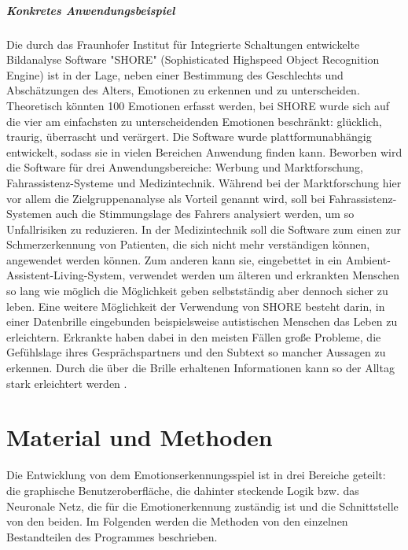\documentclass[12pt,a4paper,headinclude,twoside, plainheadsepline, open=right,numbers=noenddot]{scrreprt}
\begin{document}
\paragraph{Konkretes Anwendungsbeispiel}
Die durch das Fraunhofer Institut für Integrierte Schaltungen entwickelte Bildanalyse Software "{}SHORE"{}  (Sophisticated Highspeed Object Recognition Engine)  ist in der Lage, neben einer Bestimmung des Geschlechts und Abschätzungen des Alters, Emotionen zu erkennen und zu unterscheiden. Theoretisch könnten 100 Emotionen erfasst werden, bei SHORE wurde sich auf die vier am einfachsten zu unterscheidenden Emotionen beschränkt: glücklich, traurig, überrascht und verärgert. Die Software wurde plattformunabhängig entwickelt, sodass sie in vielen Bereichen Anwendung finden kann. Beworben wird die Software für drei Anwendungsbereiche: Werbung und Marktforschung, Fahrassistenz-Systeme und Medizintechnik. Während bei der Marktforschung hier vor allem die Zielgruppenanalyse als Vorteil genannt wird, soll bei Fahrassistenz-Systemen auch die Stimmungslage des Fahrers analysiert werden, um so Unfallrisiken zu reduzieren. In der Medizintechnik soll die Software zum einen zur Schmerzerkennung von Patienten, die sich nicht mehr verständigen können, angewendet werden können. Zum anderen kann sie, eingebettet in ein Ambient-Assistent-Living-System, verwendet werden um älteren und erkrankten Menschen so lang wie möglich die Möglichkeit geben selbstständig aber dennoch sicher zu leben.
Eine weitere Möglichkeit der Verwendung von SHORE besteht darin, in einer Datenbrille eingebunden beispielsweise autistischen Menschen das Leben zu erleichtern. Erkrankte haben dabei in den meisten Fällen große Probleme, die Gefühlslage ihres Gesprächspartners und den Subtext so mancher Aussagen zu erkennen. Durch die über die Brille erhaltenen Informationen kann so der Alltag stark erleichtert werden \cite{SHORE}. 

\chapter{Material und Methoden}
Die Entwicklung von dem Emotionserkennungsspiel ist in drei Bereiche geteilt:
die graphische Benutzeroberfläche, die dahinter steckende Logik bzw. das
Neuronale Netz, die für die Emotionerkennung zuständig ist und die Schnittstelle
von den beiden. Im Folgenden werden die Methoden von den einzelnen Bestandteilen
des Programmes beschrieben. 
\end{document}
